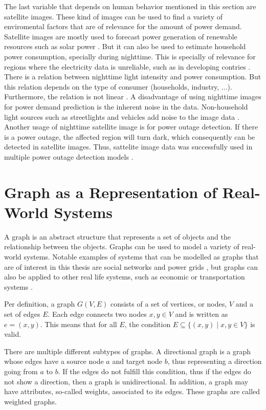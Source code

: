 The last variable that depends on human behavior mentioned in this section are
satellite images. These kind of images can be used to find a variety 
of enviromental factors that are of relevance for the amount of power demand.
Satellite images are mostly used to forecast power generation of 
renewable resources such as solar power \cite{solarprediction}.
But it can also be used to estimate household power consumption,
specially during nighttime. This is specially of relevance for regions 
where the electricity data is unreliable, such as in developing contries
\cite{reviewnighttime}. There is a relation 
between nighttime light intensity and power consumption.
But this relation depends on the type of consumer 
(households, industry, ...). Furthermore, the relation is not linear
\cite{nighttimepowerestimation}. 
A disadvantage of using nighttime images for power demand prediction is 
the inherent noise in the data. Non-household light sources such as 
streetlights and vehicles add noise to the image data \cite{reviewnighttime}.
Another usage of nighttime satellite image is for power outage detection.
If there is a power outage, the affected region will turn dark, which 
consequently can be detected in satellite images. Thus, sattelite image data 
was successfully used in multiple power outage detection models
\cite{nightpoweroutage} \cite{twitterpoweroutagelighttime}.


\section{Graph as a Representation of Real-World Systems}
\label{graphbasics}
A graph is an abstract structure that represents a set of objects and the relationship 
between the objects. Graphs can be used to model a variety of real-world systems.
Notable examples of systems that can be modelled as graphs that are of 
interest in this thesis are social networks 
\cite{socialgraphexample} and power grids \cite{powergraphexample}, but graphs can 
also be applied to other real life systems, such as economic 
or transportation systems \cite{economicsgraph}. %


Per definition, a graph $G(V, E)$ consists of a set of vertices, or nodes, $V$ and a 
set of edges $E$. Each edge connects two nodes $x, y \in V$ and is 
written as $e=(x, y)$. This means that for all $E$, the 
condition  $E \subseteq\{ (x, y) \mid x, y \in V  \}$ 
is valid.

There are multiple different subtypes of graphs. A directional graph is a graph 
whose edges have a source node $a$ and target node $b$, thus representing
a direction going from $a$ to $b$. If the edges do not fulfill this 
condition, thus if the edges do not show a direction, then a graph is unidirectional.
In addition, a graph may have attributes, so-called weights, associated to its edges.
These graphs are called weighted graphs.

